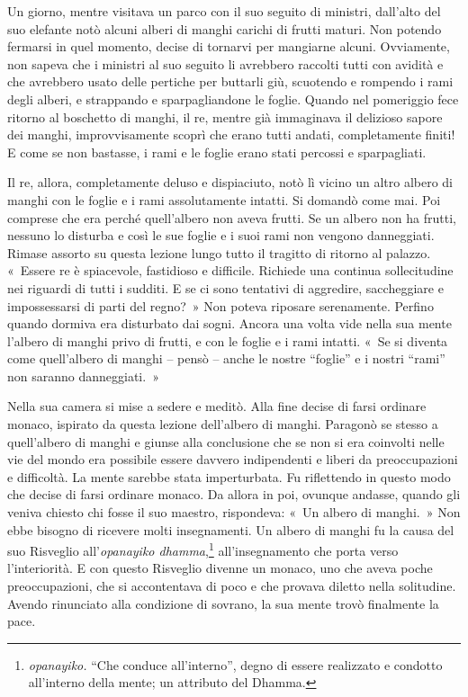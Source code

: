 Un giorno, mentre visitava un parco con il suo seguito di ministri,
dall'alto del suo elefante notò alcuni alberi di manghi carichi di
frutti maturi. Non potendo fermarsi in quel momento, decise di tornarvi
per mangiarne alcuni. Ovviamente, non sapeva che i ministri al suo
seguito li avrebbero raccolti tutti con avidità e che avrebbero usato
delle pertiche per buttarli giù, scuotendo e rompendo i rami degli
alberi, e strappando e sparpagliandone le foglie. Quando nel pomeriggio
fece ritorno al boschetto di manghi, il re, mentre già immaginava il
delizioso sapore dei manghi, improvvisamente scoprì che erano tutti
andati, completamente finiti! E come se non bastasse, i rami e le foglie
erano stati percossi e sparpagliati.

Il re, allora, completamente deluso e dispiaciuto, notò lì vicino un
altro albero di manghi con le foglie e i rami assolutamente intatti. Si
domandò come mai. Poi comprese che era perché quell'albero non aveva
frutti. Se un albero non ha frutti, nessuno lo disturba e così le sue
foglie e i suoi rami non vengono danneggiati. Rimase assorto su questa
lezione lungo tutto il tragitto di ritorno al palazzo. «~Essere re è
spiacevole, fastidioso e difficile. Richiede una continua sollecitudine
nei riguardi di tutti i sudditi. E se ci sono tentativi di aggredire,
saccheggiare e impossessarsi di parti del regno?~» Non poteva riposare
serenamente. Perfino quando dormiva era disturbato dai sogni. Ancora una
volta vide nella sua mente l'albero di manghi privo di frutti, e con le
foglie e i rami intatti. «~Se si diventa come quell'albero di manghi --
pensò -- anche le nostre ``foglie'' e i nostri ``rami'' non saranno
danneggiati.~»

Nella sua camera si mise a sedere e meditò. Alla fine decise di farsi
ordinare monaco, ispirato da questa lezione dell'albero di manghi.
Paragonò se stesso a quell'albero di manghi e giunse alla conclusione
che se non si era coinvolti nelle vie del mondo era possibile essere
davvero indipendenti e liberi da preoccupazioni e difficoltà. La mente
sarebbe stata imperturbata. Fu riflettendo in questo modo che decise di
farsi ordinare monaco. Da allora in poi, ovunque andasse, quando gli
veniva chiesto chi fosse il suo maestro, rispondeva: «~Un albero di
manghi.~» Non ebbe bisogno di ricevere molti insegnamenti. Un albero di
manghi fu la causa del suo Risveglio all'\emph{opanayiko
dhamma},\footnote{\emph{opanayiko.} ``Che conduce all'interno'', degno
  di essere realizzato e condotto all'interno della mente; un attributo
  del Dhamma.} all'insegnamento che porta verso l'interiorità. E con
questo Risveglio divenne un monaco, uno che aveva poche preoccupazioni,
che si accontentava di poco e che provava diletto nella solitudine.
Avendo rinunciato alla condizione di sovrano, la sua mente trovò
finalmente la pace.

